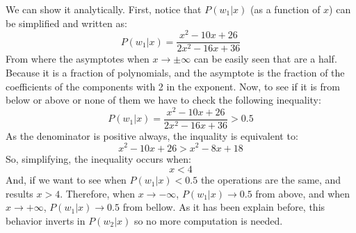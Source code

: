 \documentclass[10pt]{article}
\begin{document}
\begin{enumerate}
We can show it analytically. First, notice that $P(w_1|x)$ (as a function of $x$) can be simplified and written as:
$$
P(w_1|x) = \frac{x^2 - 10x + 26}{2x^2-16x+36}
$$ 
From where the asymptotes when $x \rightarrow \pm\infty$ can be easily seen that are a half. Because it is a fraction of polynomials, and the asymptote is the fraction of the coefficients of the components with 2 in the exponent. Now, to see if it is from below or above or none of them we have to check the following inequality:
$$
P(w_1|x) =\frac{x^2 - 10x + 26}{2x^2-16x+36}>0.5
$$
As the denominator is positive always, the inquality is equivalent to:
$$
x^2 - 10x + 26 > x^2-8x+18
$$
So, simplifying, the inequality occurs when:
$$
x < 4
$$
And, if we want to see when $P(w_1|x) < 0.5$ the operations are the same, and results $ x > 4$. Therefore, when $x \rightarrow -\infty$, 
$P(w_1|x)\rightarrow 0.5$ from above, and when $x \rightarrow +\infty$, $P(w_1|x) \rightarrow 0.5$ from bellow. As it has been explain before, this behavior inverts in $P(w_2|x)$ so no more computation is needed.


\end{enumerate}
\end{document}
